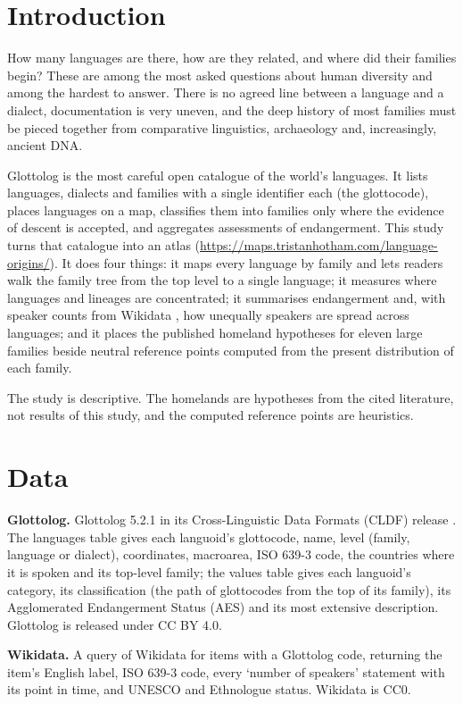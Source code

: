 \documentclass[11pt,a4paper]{article}
\begin{document}
\section{Introduction}
How many languages are there, how are they related, and where did their families begin? These are among the most asked questions about human diversity and among the hardest to answer. There is no agreed line between a language and a dialect, documentation is very uneven, and the deep history of most families must be pieced together from comparative linguistics, archaeology and, increasingly, ancient DNA.

Glottolog \citep{glottolog} is the most careful open catalogue of the world's languages. It lists languages, dialects and families with a single identifier each (the glottocode), places languages on a map, classifies them into families only where the evidence of descent is accepted, and aggregates assessments of endangerment. This study turns that catalogue into an atlas (\url{https://maps.tristanhotham.com/language-origins/}). It does four things: it maps every language by family and lets readers walk the family tree from the top level to a single language; it measures where languages and lineages are concentrated; it summarises endangerment and, with speaker counts from Wikidata \citep{wikidata}, how unequally speakers are spread across languages; and it places the published homeland hypotheses for eleven large families beside neutral reference points computed from the present distribution of each family.

The study is descriptive. The homelands are hypotheses from the cited literature, not results of this study, and the computed reference points are heuristics.

\section{Data}
\textbf{Glottolog.} Glottolog 5.2.1 in its Cross-Linguistic Data Formats (CLDF) release \citep{glottolog}. The languages table gives each languoid's glottocode, name, level (family, language or dialect), coordinates, macroarea, ISO 639-3 code, the countries where it is spoken and its top-level family; the values table gives each languoid's category, its classification (the path of glottocodes from the top of its family), its Agglomerated Endangerment Status (AES) and its most extensive description. Glottolog is released under CC BY 4.0.

\textbf{Wikidata.} A query of Wikidata \citep{wikidata} for items with a Glottolog code, returning the item's English label, ISO 639-3 code, every `number of speakers' statement with its point in time, and UNESCO and Ethnologue status. Wikidata is CC0.
\end{document}
